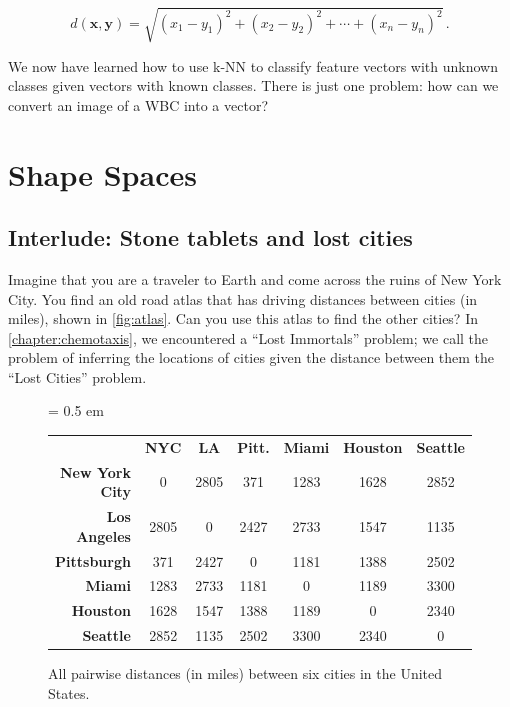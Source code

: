 $$d(\mathbf{x}, \mathbf{y}) = \sqrt{(x_1 - y_1)^2 + (x_2 - y_2)^2 + \cdots + (x_n-y_n)^2}\,.$$

We now have learned how to use k-NN to classify feature vectors with unknown classes given vectors with known classes. There is just one problem: how can we convert an image of a WBC into a vector?\\

\FloatBarrier
{}

\section{Shape Spaces}
\label{sec:shape_spaces}

\subsection{Interlude: Stone tablets and lost cities}

Imagine that you are a traveler to Earth and come across the ruins of New York City. You find an old road atlas that has driving distances between cities (in miles), shown in \autoref{fig:atlas}. Can you use this atlas to find the other cities? In \autoref{chapter:chemotaxis}, we encountered a ``Lost Immortals'' problem; we call the problem of inferring the locations of cities given the distance between them the ``Lost Cities'' problem.\\

\begin{figure}[h]
\centering
\tabcolsep = 0.5 em
\mySfFamily
\small
{}
\begin{tabular}{r c c c c c c}
\rowcolor{gray!50}
& \textbf{NYC} & \textbf{LA} & \textbf{Pitt.} & \textbf{Miami} & \textbf{Houston} & \textbf{Seattle} \\
\textbf{New York City} & 0 & 2805 & 371 & 1283 & 1628 & 2852 \\
\textbf{Los Angeles} & 2805 & 0 & 2427 & 2733 & 1547 & 1135 \\
\textbf{Pittsburgh} & 371 & 2427 & 0 & 1181 & 1388 & 2502 \\
\textbf{Miami} & 1283 & 2733 & 1181 & 0 & 1189 & 3300 \\
\textbf{Houston} & 1628 & 1547 & 1388 & 1189 & 0 & 2340 \\
\textbf{Seattle} & 2852 & 1135 & 2502 & 3300 & 2340 & 0 \\
\end{tabular}
\caption{All pairwise distances (in miles) between six cities in the United States.}
\label{fig:atlas}
\end{figure}

